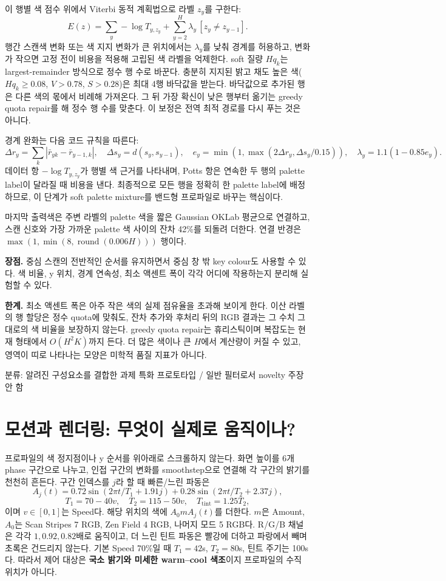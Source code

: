 \documentclass[10pt]{article}
\newcommand{\tagline}[1]{\textcolor{moss}{\small\textsf{#1}}}
\newcommand{\good}{\textbf{장점.} }
\newcommand{\trade}{\textbf{한계.} }
\begin{document}
이 행별 색 점수 위에서 Viterbi 동적 계획법으로 라벨 $z_y$를 구한다:
\[
E(z)=\sum_y-\log T_{y,z_y}+\sum_{y=2}^{H}\lambda_y\,[z_y\ne z_{y-1}].
\]
행간 스캔색 변화 또는 색 지지 변화가 큰 위치에서는 $\lambda_y$를 낮춰 경계를 허용하고, 변화가 작으면 고정 전이 비용을 적용해 고립된 색 라벨을 억제한다. soft 질량 $Hq_k$는 largest-remainder 방식으로 정수 행 수로 바꾼다. 충분히 지지된 밝고 채도 높은 색($Hq_k\ge0.08$, $V>0.78$, $S>0.28$)은 최대 4행 바닥값을 받는다. 바닥값으로 추가된 행은 다른 색의 몫에서 비례해 가져온다. 그 뒤 가장 확신이 낮은 행부터 옮기는 greedy quota repair를 해 정수 행 수를 맞춘다. 이 보정은 전역 최적 경로를 다시 푸는 것은 아니다.

경계 완화는 다음 코드 규칙을 따른다:
\[
\Delta r_y=\sum_k|\bar r_{yk}-\bar r_{y-1,k}|,\quad
\Delta s_y=d(s_y,s_{y-1}),\quad
e_y=\min(1,\max(2\Delta r_y,\Delta s_y/0.15)),\quad
\lambda_y=1.1(1-0.85e_y).
\]
데이터 항 $-\log T_{y,z_y}$가 행별 색 근거를 나타내며, Potts 항은 연속한 두 행의 palette label이 달라질 때 비용을 낸다. 최종적으로 모든 행을 정확히 한 palette label에 배정하므로, 이 단계가 soft palette mixture를 밴드형 프로파일로 바꾸는 핵심이다.

마지막 출력색은 주변 라벨의 palette 색을 짧은 Gaussian OKLab 평균으로 연결하고, 스캔 신호와 가장 가까운 palette 색 사이의 잔차 42\%를 되돌려 더한다. 연결 반경은 $\max(1,\min(8,\operatorname{round}(0.006H)))$ 행이다.

\good 중심 스캔의 전반적인 순서를 유지하면서 중심 창 밖 key colour도 사용할 수 있다. 색 비율, y 위치, 경계 연속성, 최소 액센트 폭이 각각 어디에 작용하는지 분리해 실험할 수 있다.

\trade 최소 액센트 폭은 아주 작은 색의 실제 점유율을 초과해 보이게 한다. 이산 라벨의 행 할당은 정수 quota에 맞춰도, 잔차 추가와 후처리 뒤의 RGB 결과는 그 수치 그대로의 색 비율을 보장하지 않는다. greedy quota repair는 휴리스틱이며 복잡도는 현재 형태에서 $O(H^2K)$까지 든다. 더 많은 색이나 큰 $H$에서 계산량이 커질 수 있고, 영역이 띠로 나타나는 모양은 미학적 품질 지표가 아니다.

\tagline{분류: 알려진 구성요소를 결합한 과제 특화 프로토타입 / 일반 필터로서 novelty 주장 안 함}

\section{모션과 렌더링: 무엇이 실제로 움직이나?}
프로파일의 색 정지점이나 y 순서를 위아래로 스크롤하지 않는다. 화면 높이를 6개 phase 구간으로 나누고, 인접 구간의 변화를 smoothstep으로 연결해 각 구간의 밝기를 천천히 흔든다. 구간 인덱스를 $j$라 할 때 빠른/느린 파동은
\[
A_j(t)=0.72\sin(2\pi t/T_1+1.91j)+0.28\sin(2\pi t/T_2+2.37j),
\]
\[
T_1=70-40v,\quad T_2=115-50v,\quad T_{\mathrm{tint}}=1.25T_2,
\]
이며 $v\in[0,1]$는 Speed다. 해당 위치의 색에 $A_0mA_j(t)$를 더한다. $m$은 Amount, $A_0$는 Scan Stripes 7 RGB, Zen Field 4 RGB, 나머지 모드 5 RGB다. R/G/B 채널은 각각 $1,0.92,0.82$배로 움직이고, 더 느린 틴트 파동은 빨강에 더하고 파랑에서 빼며 초록은 건드리지 않는다. 기본 Speed 70\%일 때 $T_1=42$s, $T_2=80$s, 틴트 주기는 100s다. 따라서 제어 대상은 \textbf{국소 밝기와 미세한 warm--cool 색조}이지 프로파일의 수직 위치가 아니다.
\end{document}
